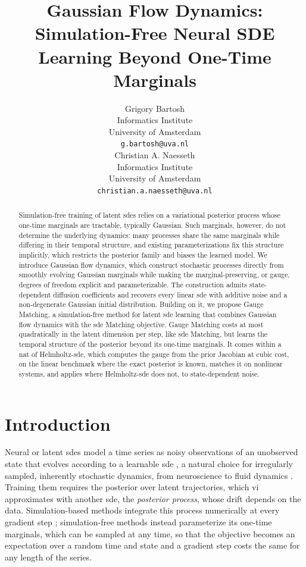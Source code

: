 \documentclass{article} %
\title{Gaussian Flow Dynamics: \\ Simulation-Free Neural SDE Learning Beyond One-Time Marginals}
\author{%
  Grigory Bartosh \\
  Informatics Institute \\
  University of Amsterdam \\
  \texttt{g.bartosh@uva.nl} \\
  \And
  Christian A. Naesseth \\
  Informatics Institute \\
  University of Amsterdam \\
  \texttt{christian.a.naesseth@uva.nl} \\
}
\newif\ifpreprint
\begin{document}
\maketitle
\ifpreprint\lhead{}\renewcommand{\headrulewidth}{0pt}\vspace{-\baselineskip}\fi

\begin{abstract}
Simulation-free training of latent \glspl{sde} relies on a variational posterior process whose one-time marginals are tractable, typically Gaussian. Such marginals, however, do not determine the underlying dynamics: many processes share the same marginals while differing in their temporal structure, and existing parameterizations fix this structure implicitly, which restricts the posterior family and biases the learned model. We introduce Gaussian flow dynamics, which construct stochastic processes directly from smoothly evolving Gaussian marginals while making the marginal-preserving, or gauge, degrees of freedom explicit and parameterizable. The construction admits state-dependent diffusion coefficients and recovers every linear \gls{sde} with additive noise and a non-degenerate Gaussian initial distribution. Building on it, we propose Gauge Matching, a simulation-free method for latent \gls{sde} learning that combines Gaussian flow dynamics with the \gls{sde} Matching objective. Gauge Matching costs at most quadratically in the latent dimension per step, like \gls{sde} Matching, but learns the temporal structure of the posterior beyond its one-time marginals. It comes within a nat of Helmholtz-\gls{sde}, which computes the gauge from the prior Jacobian at cubic cost, on the linear benchmark where the exact posterior is known, matches it on nonlinear systems, and applies where Helmholtz-\gls{sde} does not, to state-dependent noise.
\end{abstract}
\glsresetall
\ifpreprint\vspace{-\baselineskip}\fi

\section{Introduction}

Neural or latent \glspl{sde} model a time series as noisy observations of an unobserved state that evolves according to a learnable \gls{sde} \citep{movellan2002monte,tzen2019neural,hodgkinson2020stochastic,li2020scalable}, a natural choice for irregularly sampled, inherently stochastic dynamics, from neuroscience to fluid dynamics \citep{course2023state,smith2026closing}. Training them requires the posterior over latent trajectories, which \gls{vi} approximates with another \gls{sde}, the \emph{posterior process}, whose drift depends on the data. Simulation-based methods integrate this process numerically at every gradient step \citep{li2020scalable}; simulation-free methods \citep{course2023amortized,bartosh2025sde} instead parameterize its one-time marginals, which can be sampled at any time, so that the objective becomes an expectation over a random time and state and a gradient step costs the same for any length of the series.
\end{document}
